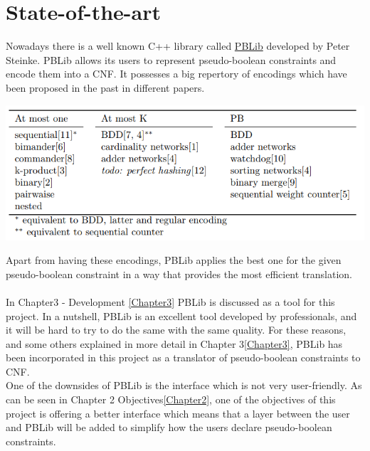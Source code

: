 \section{State-of-the-art}



Nowadays there is a well known C++ library called \href{http://tools.computational-logic.org/content/pblib.php}{PBLib} developed by Peter Steinke. PBLib allows its users to represent pseudo-boolean constraints and encode them into a CNF.  
It possesses a big repertory of encodings which have been proposed in the past in different papers\cite{Steinke2015}.  
\begin{center}
	\includegraphics[width=1\textwidth]{Figures/PBLibEncodings.png}
\end{center}
Apart from having these encodings, PBLib applies the best one for the given pseudo-boolean constraint in a way that provides the most efficient translation. \\\\
In Chapter3 - Development \ref{Chapter3} PBLib is discussed as a tool for this project. In a nutshell, PBLib is an excellent tool developed by professionals, and it will be hard to try to do the same with the same quality. For these reasons, and some others explained in more detail in Chapter 3\ref{Chapter3}, PBLib has been incorporated in this project as a translator of pseudo-boolean constraints to CNF.  \\
One of the downsides of PBLib is the interface which is not very user-friendly. As can be seen in Chapter 2 Objectives\ref{Chapter2}, one of the objectives of this project is offering a better interface which means that a layer between the user and PBLib will be added to simplify how the users declare pseudo-boolean constraints.  

